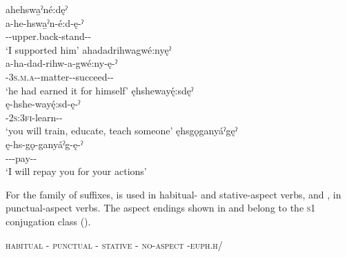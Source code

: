 \ex ahehswa̱ˀné:dęˀ\\
\gll a-he-hswa̱ˀn-é:d-ę-ˀ\\
 {\factual}--upper.back-stand-{\benefactive}-{\punctual}\\
\glt `I supported him'
\ex ahadadrihwagwé:nyęˀ\\
\gll a-ha-dad-rihw-a-gwé:ny-ę-ˀ\\
 {\factual}-\textsc{3s.m.a}-{}-matter-{\joinerA}-succeed-{\benefactive}-{\punctual}\\
\glt `he had earned it for himself'
\ex ęhshewayę́:sdęˀ\\
\gll ę-hshe-wayę́:sd-ę-ˀ\\
 \fut-\textsc{2s:3fi}-learn-{\benefactive}-{\punctual}\\
\glt `you will train, educate, teach someone'
\ex ęhsgǫganyáˀgęˀ\\
\gll ę-hs-gǫ-ganyáˀg-ę-ˀ\\
 \fut-{\repetitive}--pay-{\benefactive}-{\punctual}\\
\glt `I will repay you for your actions'
\z
\z

For the  family of suffixes,  is used in habitual- and stative-aspect verbs, and , in punctual-aspect verbs. The aspect endings shown in  and  belong to the \textsc{s1} conjugation class ().

\ea\label{ex:benefex7}
\ea \textsc{habitual}  {\benefactive}-{\habitual}
\ex \textsc{punctual}  {\benefactive}-{\punctual}
\ex \textsc{stative}  {\benefactive}-{\stative}
\ex \textsc{no-aspect}  {\benefactive}-\textsc{euph.h}/{\noaspect}
\z
\z


